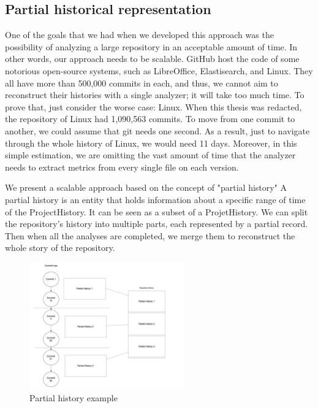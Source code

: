 \subsection*{Partial historical representation}
One of the goals that we had when we developed this approach was the possibility of analyzing a large repository in an acceptable amount of time. 
In other words, our approach needs to be scalable.
GitHub host the code of some notorious open-source systems, such as LibreOffice, Elastisearch, and Linux.
They all have more than 500,000 commits in each, and thus, we cannot aim to reconstruct their histories with a single analyzer; it will take too much time.  
To prove that, just consider the worse case: Linux. 
When this thesis was redacted, the repository of Linux had 1,090,563 commits. 
To move from one commit to another, we could assume that git needs one second. 
As a result, just to navigate through the whole history of Linux, we would need 11 days.
Moreover, in this simple estimation, we are omitting the vast amount of time that the analyzer needs to extract metrics from every single file on each version. 

We present a scalable approach based on the concept of "partial history" 
A partial history is an entity that holds information about a specific range of time of the ProjectHistory. 
It can be seen as a subset of a ProjetHistory. 
We can split the repository's history into multiple parts, each represented by a partial record. Then when all the analyses are completed, we merge them to reconstruct the whole story of the repository.


\begin{figure}
    \includegraphics[width=0.6\textwidth]{PartialHistory.png}
    \caption{Partial history example}
    \label{fig:PartialHistory}
\end{figure}

